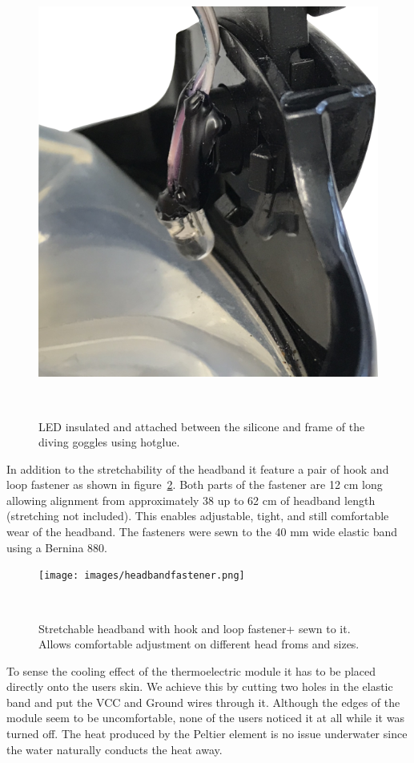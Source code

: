 \begin{figure}
	\includegraphics[width= \textwidth]{images/LEDcloseupcut.png}
	\caption{LED insulated and attached between the silicone and frame of the diving goggles using hotglue. }~\label{fig:ledcloseup}
\end{figure}

In addition to the stretchability of the headband it feature a pair of hook and loop fastener as shown in figure~\ref{fig:headbandfastener}.
Both parts of the fastener are 12 cm long allowing alignment from approximately 38 up to 62 cm of headband length (stretching not included).
This enables adjustable, tight, and still comfortable wear of the headband.
The fasteners were sewn to the 40 mm wide elastic band using a Bernina 880.

\begin{figure}
	\texttt{[image: images/headbandfastener.png]}
	\caption{Stretchable headband with hook and loop fastener+ sewn to it. Allows comfortable adjustment on different head froms and sizes.}~\label{fig:headbandfastener}
\end{figure}

To sense the cooling effect of the thermoelectric module it has to be placed directly onto the users skin.
We achieve this by cutting two holes in the elastic band and put the VCC and Ground wires through it. 
Although the edges of the module seem to be uncomfortable, none of the users noticed it at all while it was turned off.
The heat produced by the Peltier element is no issue underwater since the water naturally conducts the heat away.

